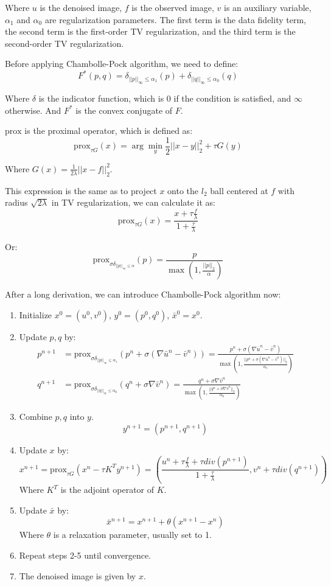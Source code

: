 \documentclass[10pt,a4paper,oneside,numbers=noenddot]{scrbook}
\theoremstyle{ctplain}
\theoremstyle{ctresult}
\begin{document}
Where $u$ is the denoised image, $f$ is the observed image, $v$ is an auxiliary
variable, $\alpha_1$ and $\alpha_0$ are regularization parameters. The first term
is the data fidelity term, the second term is the first-order TV regularization, and
the third term is the second-order TV regularization.

Before applying Chambolle-Pock algorithm, we need to define:
\[
  F^{*}(p, q) = \delta_{||p||_\infty \leq \alpha_1}(p) + \delta_{||q||_\infty \leq
  \alpha_0}(q)
\]

Where $\delta$ is the indicator function, which is 0 if the condition is satisfied,
and $\infty$ otherwise. And $F^*$ is the convex conjugate of $F$.

$\text{prox}$ is the proximal operator, which is defined as:
\[
  \text{prox}_{\tau G}(x) = \arg\min_y \frac{1}{2} ||x - y||_2^2 + \tau G(y)
\]

Where $G(x) = \frac{1}{2\lambda} ||x - f||_2^2$. 

This expression is the same as to project $x$ onto the $l_2$ ball centered at $f$
with radius $\sqrt{2\lambda}$ in TV regularization, we can calculate it as:
\[
  \text{prox}_{\tau G}(x) = \frac{x + \tau \frac{f}{\lambda}}{1 + \frac{\tau}{\lambda}}
\]

Or:
\[
  \text{prox}_{\sigma \delta_{||p||_\infty \leq \alpha}}(p) = \frac{p}{\max(1,
  \frac{||p||_2}{\alpha})}
\]

\vspace{1em}

After a long derivation, we can introduce Chambolle-Pock algorithm now:
\begin{enumerate}
  \item Initialize $x^0 = (u^0, v^0)$, $y^0 = (p^0, q^0)$, $\bar{x}^0 = x^0$.
  \item Update $p, q$ by:
  \begin{align*}
    p^{n+1} &= \text{prox}_{\sigma \delta_{||p||_\infty \leq \alpha_1}}(p^n + \sigma
    (\nabla \bar{u}^n - \bar{v}^n)) = \frac{p^n + \sigma (\nabla \bar{u}^n -
    \bar{v}^n)}{\max(1, \frac{||p^n + \sigma (\nabla \bar{u}^n - \bar{v}^n)||_2}{\alpha_1})}
  \\
    q^{n+1} &= \text{prox}_{\sigma \delta_{||q||_\infty \leq \alpha_0}}(q^n + \sigma \nabla
    \bar{v}^n) = \frac{q^n + \sigma \nabla \bar{v}^n}{\max(1, \frac{||q^n + \sigma \nabla
    \bar{v}^n||_2}{\alpha_0})}
  \end{align*}
  \item Combine $p, q$ into $y$.
  \[
    y^{n+1} = (p^{n+1}, q^{n+1})
  \]
  \item Update $x$ by:
  \[
    x^{n+1} = \text{prox}_{\tau G}(x^n - \tau K^T y^{n+1}) = \left(
    \frac{u^n + \tau \frac{f}{\lambda} + \tau div(p^{n+1})}{1 + \frac{\tau}{\lambda}},
    v^n + \tau div(q^{n+1}) \right)
  \]
  Where $K^T$ is the adjoint operator of $K$.
  \item Update $\bar{x}$ by:
  \[
    \bar{x}^{n+1} = x^{n+1} + \theta (x^{n+1} - x^n)
  \]
  Where $\theta$ is a relaxation parameter, usually set to 1.
  \item Repeat steps 2-5 until convergence.
  \item The denoised image is given by $x$.
\end{enumerate}
\end{document}
